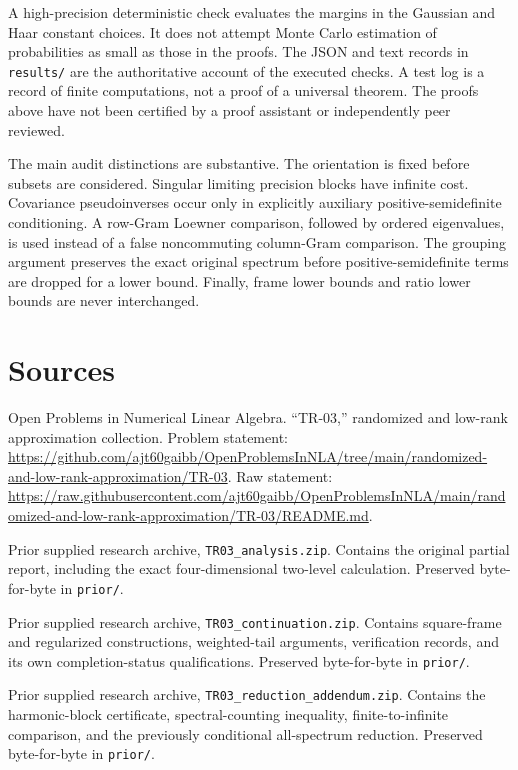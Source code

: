 \documentclass[11pt]{article}
\theoremstyle{remark}\newtheorem{remark}[theorem]{Remark}
\begin{document}
A high-precision deterministic check evaluates the margins in the Gaussian and Haar constant choices. It does not attempt Monte Carlo estimation of probabilities as small as those in the proofs. The JSON and text records in \texttt{results/} are the authoritative account of the executed checks. A test log is a record of finite computations, not a proof of a universal theorem. The proofs above have not been certified by a proof assistant or independently peer reviewed.

The main audit distinctions are substantive. The orientation is fixed before subsets are considered. Singular limiting precision blocks have infinite cost. Covariance pseudoinverses occur only in explicitly auxiliary positive-semidefinite conditioning. A row-Gram Loewner comparison, followed by ordered eigenvalues, is used instead of a false noncommuting column-Gram comparison. The grouping argument preserves the exact original spectrum before positive-semidefinite terms are dropped for a lower bound. Finally, frame lower bounds and ratio lower bounds are never interchanged.

\section*{Sources}
\begin{enumerate}[label={[\arabic*]}]
\item Open Problems in Numerical Linear Algebra. ``TR-03,'' randomized and low-rank approximation collection. Problem statement:
\url{https://github.com/ajt60gaibb/OpenProblemsInNLA/tree/main/randomized-and-low-rank-approximation/TR-03}.
Raw statement:
\url{https://raw.githubusercontent.com/ajt60gaibb/OpenProblemsInNLA/main/randomized-and-low-rank-approximation/TR-03/README.md}.
\item Prior supplied research archive, \texttt{TR03\_analysis.zip}. Contains the original partial report, including the exact four-dimensional two-level calculation. Preserved byte-for-byte in \texttt{prior/}.
\item Prior supplied research archive, \texttt{TR03\_continuation.zip}. Contains square-frame and regularized constructions, weighted-tail arguments, verification records, and its own completion-status qualifications. Preserved byte-for-byte in \texttt{prior/}.
\item Prior supplied research archive, \texttt{TR03\_reduction\_addendum.zip}. Contains the harmonic-block certificate, spectral-counting inequality, finite-to-infinite comparison, and the previously conditional all-spectrum reduction. Preserved byte-for-byte in \texttt{prior/}.
\end{enumerate}
\end{document}
